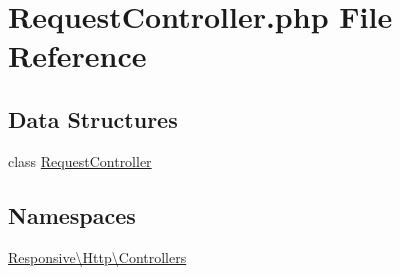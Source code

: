 \hypertarget{_request_controller_8php}{}\section{Request\+Controller.\+php File Reference}
\label{_request_controller_8php}
\subsection*{Data Structures}
\begin{DoxyCompactItemize}
\item 
class \mbox{\hyperlink{class_responsive_1_1_http_1_1_controllers_1_1_request_controller}{Request\+Controller}}
\end{DoxyCompactItemize}
\subsection*{Namespaces}
\begin{DoxyCompactItemize}
\item 
 \mbox{\hyperlink{namespace_responsive_1_1_http_1_1_controllers}{Responsive\textbackslash{}\+Http\textbackslash{}\+Controllers}}
\end{DoxyCompactItemize}
